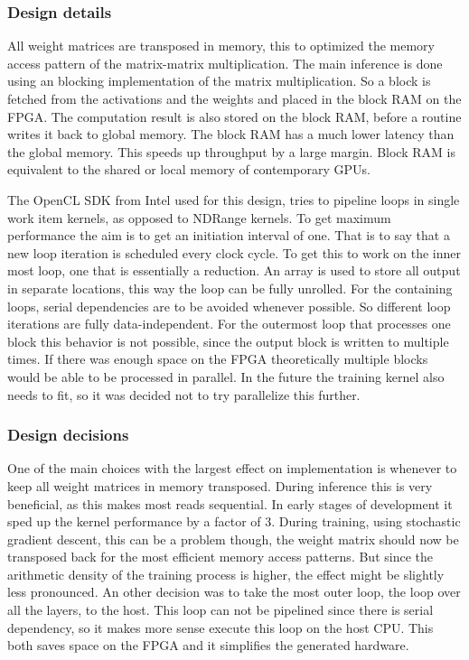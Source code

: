 \documentclass[techrep,english]{ipsj} %
\begin{document}
\subsubsection{Design details}
All weight matrices are transposed in memory, this to optimized the memory access pattern of the matrix-matrix multiplication.
The main inference is done using an blocking implementation of the matrix multiplication.
So a block is fetched from the activations and the weights and placed in the block RAM on the FPGA.
The computation result is also stored on the block RAM, before a routine writes it back to global memory.
The block RAM has a much lower latency than the global memory.
This speeds up throughput by a large margin.
Block RAM is equivalent to the shared or local memory of contemporary GPUs.

The OpenCL SDK from Intel used for this design, tries to pipeline loops in single work item kernels, as opposed to NDRange kernels. %
To get maximum performance the aim is to get an initiation interval of one.
That is to say that a new loop iteration is scheduled every clock cycle.
To get this to work on the inner most loop, one that is essentially a reduction.
An array is used to store all output in separate locations, this way the loop can be fully unrolled.
For the containing loops, serial dependencies are to be avoided whenever possible.
So different loop iterations are fully data-independent.
For the outermost loop that processes one block this behavior is not possible, since the output block is written to multiple times.
If there was enough space on the FPGA theoretically multiple blocks would be able to be processed in parallel.
In the future the training kernel also needs to fit, so it was decided not to try parallelize this further.

\subsubsection{Design decisions}
One of the main choices with the largest effect on implementation is whenever to keep all weight matrices in memory transposed.
During inference this is very beneficial, as this makes most reads sequential.
In early stages of development it sped up the kernel performance by a factor of \num{3}.
During training, using stochastic gradient descent, this can be a problem though, the weight matrix should now be transposed back for the most efficient memory access patterns.
But since the arithmetic density of the training process is higher, the effect might be slightly less pronounced.
An other decision was to take the most outer loop, the loop over all the layers, to the host.
This loop can not be pipelined since there is serial dependency, so it makes more sense execute this loop on the host CPU.
This both saves space on the FPGA and it simplifies the generated hardware.
\end{document}
